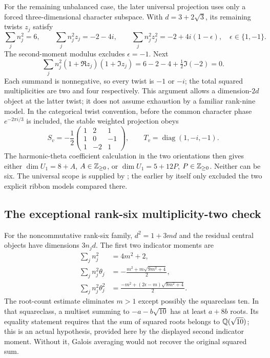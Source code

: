 For the remaining unbalanced case, the later universal projection
uses only a forced three-dimensional character subspace. With
$d=3+2\sqrt3$, its remaining twists $z_j$ satisfy
\[
 \sum_jn_j^2=6,\qquad
 \sum_jn_j^2z_j=-2-4i,\qquad
 \sum_jn_j^2z_j^2=-2+4i(1-\epsilon),
 \quad\epsilon\in\{1,-1\}.
\]
The second-moment modulus excludes $\epsilon=-1$. Next
\[
 \sum_jn_j^2(1+\Re z_j)(1+\Im z_j)
 =6-2-4+\tfrac12\Im(-2)=0.
\]
Each summand is nonnegative, so every twist is $-1$ or $-i$;
the total squared multiplicities are two and four respectively.
This argument allows a dimension-$2d$ object at the latter twist;
it does not assume exhaustion by a familiar rank-nine model.
In the categorical twist convention, before the common character
phase $e^{-2\pi i/3}$ is included, the stable weighted projection obeys
\[
 S_v=-\frac12\begin{pmatrix}1&2&1\\1&0&-1\\1&-2&1\end{pmatrix},
 \qquad T_v=\operatorname{diag}(1,-i,-1).
\]
The harmonic-theta coefficient calculation in the two orientations
then gives either $\dim U_1=8+A$, $A\in\mathbb Z_{\geq0}$, or
$\dim U_1=5+12P$, $P\in\mathbb Z_{\geq0}$. Neither can be six.
The universal scope is supplied by
;
the earlier
by itself only excluded the two explicit ribbon models compared there.

\subsection{The exceptional rank-six multiplicity-two check}

For the noncommutative rank-six family,
$d^2=1+3md$ and the residual central objects have dimensions
$3n_jd$. The first two indicator moments are
\[
\begin{split}
 \sum_jn_j^2&=4m^2+2,\\
 \sum_jn_j^2\theta_j
   &=-\frac{m^2+m\sqrt{9m^2+4}}2,\\
 \sum_jn_j^2\theta_j^2
   &=\frac{-m^2+(2\epsilon-m)\sqrt{9m^2+4}}2.
\end{split}
\]
The root-count estimate eliminates $m>1$ except possibly the
squareclass ten. In that squareclass, a multiset summing to
$-a-b\sqrt{10}$ has at least $a+8b$ roots. Its equality statement
requires that the sum of squared roots belongs to $\mathbb Q(\sqrt{10})$;
this is an actual hypothesis, provided here by the displayed
second indicator moment. Without it, Galois averaging would not
recover the original squared sum.

